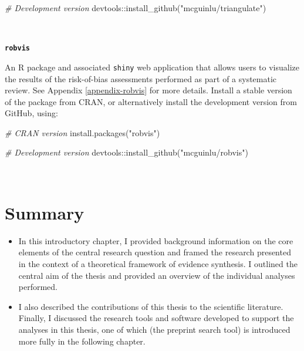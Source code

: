 \documentclass[a4paper, twoside]{templates/ociamthesis}
\newenvironment{Shaded}{\begin{snugshade}}{\end{snugshade}}
\newcommand{\CommentTok}[1]{\textcolor[rgb]{0.56,0.35,0.01}{\textit{#1}}}
\newcommand{\FunctionTok}[1]{\textcolor[rgb]{0.00,0.00,0.00}{#1}}
\newcommand{\NormalTok}[1]{#1}
\newcommand{\SpecialCharTok}[1]{\textcolor[rgb]{0.00,0.00,0.00}{#1}}
\newcommand{\StringTok}[1]{\textcolor[rgb]{0.31,0.60,0.02}{#1}}
\renewenvironment{Shaded}
{
  \vspace{4pt}%
  \begin{snugshade}%
}{%
  \end{snugshade}%
  \vspace{4pt}%
}
\begin{document}
\begin{Shaded}
\begin{Highlighting}[]
\CommentTok{\# Development version}
\NormalTok{devtools}\SpecialCharTok{::}\FunctionTok{install\_github}\NormalTok{(}\StringTok{"mcguinlu/triangulate"}\NormalTok{)}
\end{Highlighting}
\end{Shaded}

~

\textbf{\texttt{robvis}}

An R package and associated \texttt{shiny} web application that allows users to visualize the results of the risk-of-bias assessments performed as part of a systematic review. See Appendix \ref{appendix-robvis} for more details. Install a stable version of the package from CRAN, or alternatively install the development version from GitHub, using:

\begin{Shaded}
\begin{Highlighting}[]
\CommentTok{\# CRAN version}
\FunctionTok{install.packages}\NormalTok{(}\StringTok{"robvis"}\NormalTok{)}

\CommentTok{\# Development version}
\NormalTok{devtools}\SpecialCharTok{::}\FunctionTok{install\_github}\NormalTok{(}\StringTok{"mcguinlu/robvis"}\NormalTok{)}
\end{Highlighting}
\end{Shaded}

~

\hypertarget{summary}{%
\section{Summary}\label{summary}}

\begin{itemize}
\item
  In this introductory chapter, I provided background information on the core elements of the central research question and framed the research presented in the context of a theoretical framework of evidence synthesis. I outlined the central aim of the thesis and provided an overview of the individual analyses performed.
\item
  I also described the contributions of this thesis to the scientific literature. Finally, I discussed the research tools and software developed to support the analyses in this thesis, one of which (the preprint search tool) is introduced more fully in the following chapter.
\end{itemize}
\end{document}
